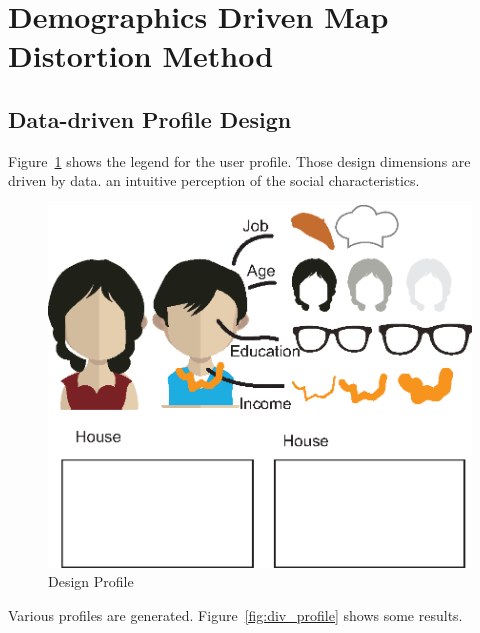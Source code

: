 \section{Demographics Driven Map Distortion Method}

\subsection{Data-driven Profile Design}

Figure~\ref{fig:design_profile} shows the legend for the user profile. Those design dimensions are driven by data. an intuitive perception of the social characteristics. 

\begin{figure}[htb!]
 \centering %
 \includegraphics[width=\columnwidth]{pictures/design_profile}
 \caption{Design Profile}
 \label{fig:design_profile}
\end{figure}

Various profiles are generated. Figure~\ref{fig:div_profile} shows some results.


